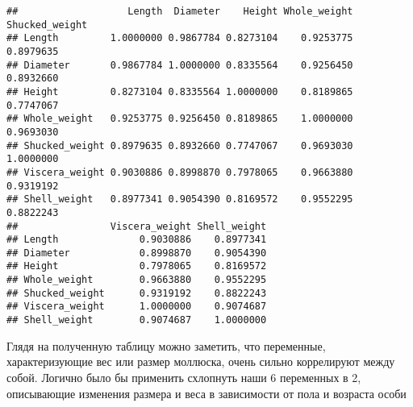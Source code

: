 \documentclass[
]{article}
\begin{document}
\begin{verbatim}
##                   Length  Diameter    Height Whole_weight Shucked_weight
## Length         1.0000000 0.9867784 0.8273104    0.9253775      0.8979635
## Diameter       0.9867784 1.0000000 0.8335564    0.9256450      0.8932660
## Height         0.8273104 0.8335564 1.0000000    0.8189865      0.7747067
## Whole_weight   0.9253775 0.9256450 0.8189865    1.0000000      0.9693030
## Shucked_weight 0.8979635 0.8932660 0.7747067    0.9693030      1.0000000
## Viscera_weight 0.9030886 0.8998870 0.7978065    0.9663880      0.9319192
## Shell_weight   0.8977341 0.9054390 0.8169572    0.9552295      0.8822243
##                Viscera_weight Shell_weight
## Length              0.9030886    0.8977341
## Diameter            0.8998870    0.9054390
## Height              0.7978065    0.8169572
## Whole_weight        0.9663880    0.9552295
## Shucked_weight      0.9319192    0.8822243
## Viscera_weight      1.0000000    0.9074687
## Shell_weight        0.9074687    1.0000000
\end{verbatim}

Глядя на полученную таблицу можно заметить, что переменные,
характеризующие вес или размер моллюска, очень сильно коррелируют между
собой. Логично было бы применить схлопнуть наши 6 переменных в 2,
описывающие изменения размера и веса в зависимости от пола и возраста
особи
\end{document}
